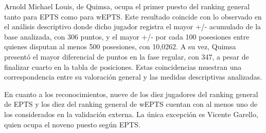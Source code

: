 \documentclass[
  12pt,
]{article}
\begin{document}
\begin{table}[H]
\centering
\caption{\label{tab:unnamed-chunk-40}Diez jugadores mejor valorados según wEPTS total, estimados mediante Elastic Net.}
\centering
{}
\end{table}

Arnold Michael Louis, de Quimsa, ocupa el primer puesto del ranking
general tanto para EPTS como para wEPTS. Este resultado coincide con lo
observado en el análisis descriptivo donde dicho jugador registra el
mayor +/- acumulado de la base analizada, con 306 puntos, y el mayor +/-
por cada 100 posesiones entre quienes disputan al menos 500 posesiones,
con 10,0262. A su vez, Quimsa presentó el mayor diferencial de puntos en
la fase regular, con 347, a pesar de finalizar cuarto en la tabla de
posiciones. Estas coincidencias muestran una correspondencia entre su
valoración general y las medidas descriptivas analizadas.

En cuanto a los reconocimientos, nueve de los diez jugadores del ranking
general de EPTS y los diez del ranking general de wEPTS cuentan con al
menos uno de los considerados en la validación externa. La única
excepción es Vicente Garello, quien ocupa el noveno puesto según EPTS.
\end{document}
